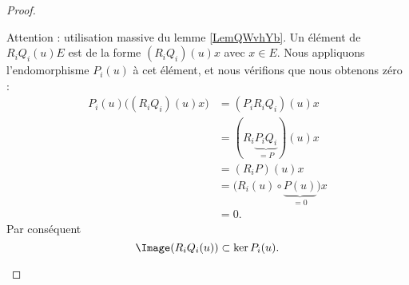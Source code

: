 \begin{proof}
\begin{subproof}
				\label{SPITEMooQIPJooXleSMb}
		Attention : utilisation massive du lemme \ref{LemQWvhYb}. Un élément de \( R_iQ_i(u)E\) est de la forme \( (R_iQ_i)(u)x\) avec \( x\in E\). Nous appliquons l'endomorphisme \( P_i(u)\) à cet élément, et nous vérifions que nous obtenons zéro :
		\begin{subequations}
			\begin{align}
				P_i(u)\big( (R_iQ_i)(u)x \big) & =(P_iR_iQ_i)(u)x                                \\
				                               & =(R_i\underbrace{P_iQ_i}_{=P})(u)x              \\
				                               & =(R_iP)(u)x                                     \\
				                               & =\big( R_i(u)\circ \underbrace{P(u)}_{=0}\big)x \\
				                               & =0.
			\end{align}
		\end{subequations}
		Par conséquent
		\begin{equation}		\label{EQooULVHooAgKzTE}
			\Image(R_iQ_i(u))\subset \ker P_i(u).
		\end{equation}


\end{subproof}
\end{proof}
